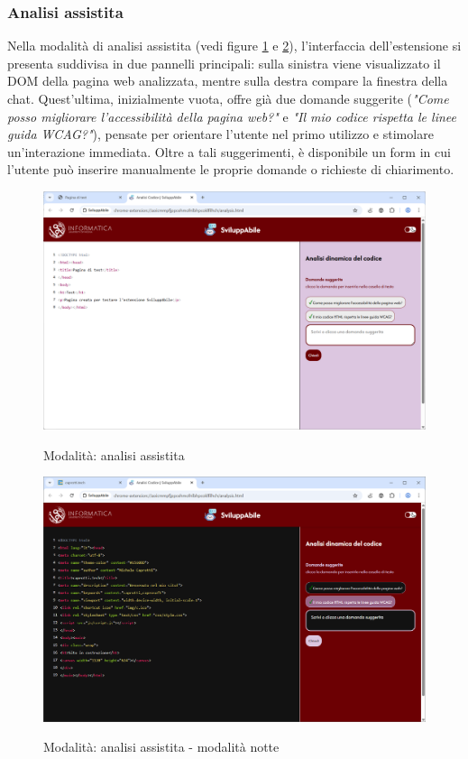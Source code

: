 \subsubsection{Analisi assistita}
\noindent Nella modalità di analisi assistita (vedi figure \ref{fig:aass} e \ref{fig:aass_notte}), l’interfaccia dell’estensione si presenta suddivisa in due pannelli principali: sulla sinistra viene visualizzato il DOM della pagina web analizzata, mentre sulla destra compare la finestra della chat. Quest’ultima, inizialmente vuota, offre già due domande suggerite (\textit{"Come posso migliorare l'accessibilità della pagina web?"} e \textit{"Il mio codice rispetta le linee guida WCAG?"}), pensate per orientare l’utente nel primo utilizzo e stimolare un’interazione immediata. Oltre a tali suggerimenti, è disponibile un form in cui l’utente può inserire manualmente le proprie domande o richieste di chiarimento.\\

\begin{figure}[H]
    \centering
    \includegraphics[width=1\linewidth, alt={Modalità di analisi assistita}]{img/analisi_ass.png}
    \caption{Modalità: analisi assistita}\label{fig:aass}
\end{figure}

\begin{figure}[H]
    \centering
    \includegraphics[width=1\linewidth, alt={Modalità di analisi assistita - modalità notte}]{img/analisi_ass_dark.png}
    \caption{Modalità: analisi assistita - modalità notte}\label{fig:aass_notte}
\end{figure}

